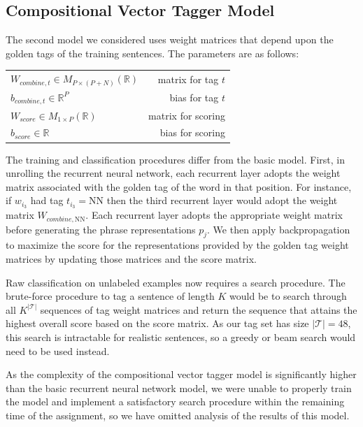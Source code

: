 \documentclass[11pt]{article}
\begin{document}
\subsection{Compositional Vector Tagger Model}

The second model we considered uses weight matrices that depend upon the golden tags of the training sentences. The parameters are as follows:

\begin{center}
\begin{tabular}{ l r }
  $W_{combine,t}\in M_{P\times(P+N)}(\mathbb{R})$ & matrix for tag $t$ \\
  $b_{combine,t}\in \mathbb{R}^P$ & bias for tag $t$ \\
  $W_{score}\in M_{1\times P}(\mathbb{R})$ & matrix for scoring \\
  $b_{score}\in \mathbb{R}$ & bias for scoring \\
\end{tabular}
\end{center}

\vspace{5mm}
The training and classification procedures differ from the basic model. First, in unrolling the recurrent neural network, each recurrent layer adopts the weight matrix associated with the golden tag of the word in that position. For instance, if $w_{i_3}$ had tag $t_{i_3} = \text{NN}$ then the third recurrent layer would adopt the weight matrix $W_{combine,\text{NN}}$. Each recurrent layer adopts the appropriate weight matrix before generating the phrase representations $p_j$. We then apply backpropagation to maximize the score for the representations provided by the golden tag weight matrices by updating those matrices and the score matrix.

Raw classification on unlabeled examples now requires a search procedure. The brute-force procedure to tag a sentence of length $K$ would be to search through all $K^{\left\vert\mathcal{T}\right\vert}$ sequences of tag weight matrices and return the sequence that attains the highest overall score based on the score matrix. As our tag set has size $\left\vert\mathcal{T}\right\vert=48$, this search is intractable for realistic sentences, so a greedy or beam search would need to be used instead.

As the complexity of the compositional vector tagger model is significantly higher than the basic recurrent neural network model, we were unable to properly train the model and implement a satisfactory search procedure within the remaining time of the assignment, so we have omitted analysis of the results of this model.
\end{document}
